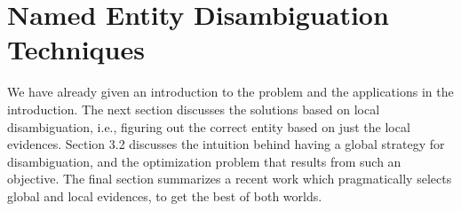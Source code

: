 \section{Named Entity Disambiguation Techniques}
We have already given an introduction to the problem and the applications in the introduction.
The next section discusses the solutions based on local disambiguation, i.e., figuring 
out the correct entity based on just the local evidences. Section 3.2 discusses the intuition
behind having a global strategy for disambiguation, and the optimization problem that
results from such an objective. The final section summarizes a recent work which 
pragmatically selects global and local evidences, to get the best of both worlds.
